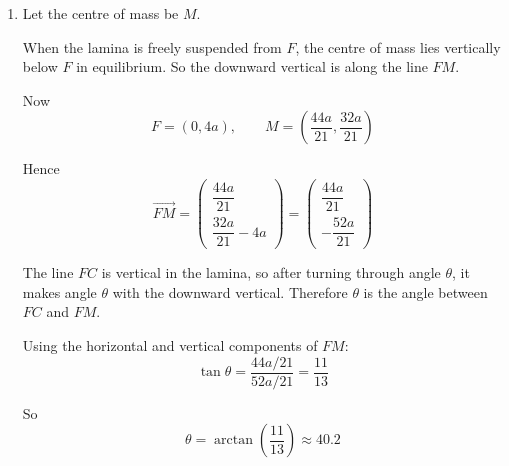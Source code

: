 \documentclass[leqno]{article}
\begin{document}
\begin{enumerate}[
  label=\textbf{\arabic*.},
  leftmargin=*,
  topsep=0pt,
  partopsep=0pt,
  parsep=0pt
]
\begin{djsSolution}
\begin{enumerate}[label=\textbf{(\alph*)}, start=1]
Taking moments about the $x$-axis:
\begin{align*}
14a^2\bar{y} &= 8a^2(a)+4a^2(3a)+2a^2\left(\frac{2a}{3}\right) \\
&= 8a^3+12a^3+\frac{4a^3}{3} \\
&= \frac{64a^3}{3}
\end{align*}

Hence
\[
\bar{y}=\frac{64a^3/3}{14a^2}=\frac{32a}{21}
\]

So the coordinates of the centre of mass of the lamina are
\[
\left(\frac{44a}{21},\frac{32a}{21}\right)
\]

  \item Let the centre of mass be $M$.

When the lamina is freely suspended from $F$, the centre of mass lies vertically below $F$ in equilibrium.
So the downward vertical is along the line $FM$.

Now
\[
F=(0,4a), \qquad M=\left(\frac{44a}{21},\frac{32a}{21}\right)
\]

Hence
\[
\overrightarrow{FM}=\begin{pmatrix}\dfrac{44a}{21}\\[6pt] \dfrac{32a}{21}-4a\end{pmatrix}=\begin{pmatrix}\dfrac{44a}{21}\\[6pt] -\dfrac{52a}{21}\end{pmatrix}
\]

The line $FC$ is vertical in the lamina, so after turning through angle $\theta$, it makes angle $\theta$ with the downward vertical.
Therefore $\theta$ is the angle between $FC$ and $FM$.

Using the horizontal and vertical components of $FM$:
\[
\tan\theta=\frac{44a/21}{52a/21}=\frac{11}{13}
\]

So
\[
\theta=\arctan\left(\frac{11}{13}\right)\approx 40.2
\]
\end{enumerate}
\end{djsSolution}

\newpage

\questionitem

\begin{figure}[H]
    \centering
{}
\end{figure}
\end{enumerate}
\end{document}
